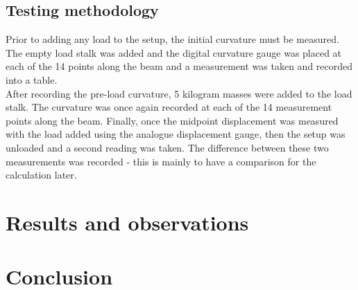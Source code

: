 \documentclass[12pt]{article}
\begin{document}
        \subsection{Testing methodology}
            Prior to adding any load to the setup, the initial curvature must be measured. The empty load stalk was added and the digital curvature gauge was 
            placed at each of the 14 points along the beam and a measurement was taken and recorded into a table. \\ After recording the pre-load curvature, 5 kilogram masses
            were added to the load stalk. The curvature was once again recorded at each of the 14 measurement points along the beam. Finally, once the midpoint displacement
            was measured with the load added using the analogue displacement gauge, then the setup was unloaded and a second reading was taken. The difference between these
            two measurements was recorded - this is mainly to have a comparison for the calculation later.
    \section{Results and observations}

    \section{Conclusion}
\end{document}
